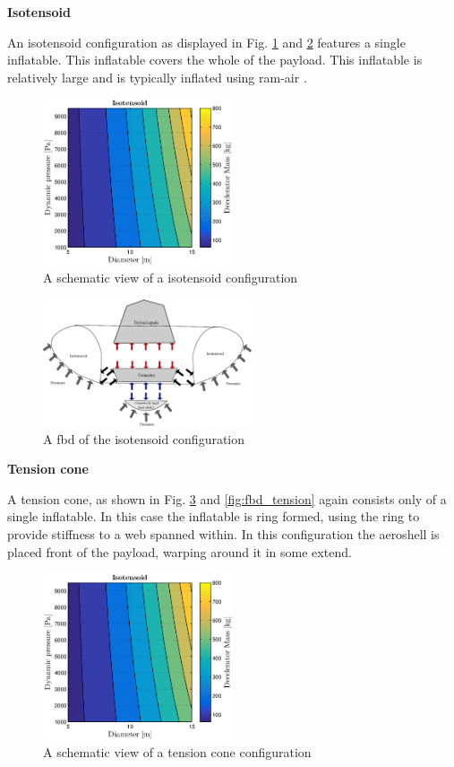 \textbf{Isotensoid}

An isotensoid configuration as displayed in Fig. \ref{fig:conc_iso} and \ref{fig:fbd_iso} features a single inflatable. This inflatable covers the whole of the payload. This inflatable is relatively large and is typically inflated using ram-air \cite{Smith2011}. 

\begin{figure}[H]
\centering
\includegraphics[width = 0.5\textwidth]{Figure/ISO_comp.eps}
\caption{A schematic view of a isotensoid configuration}
\label{fig:conc_iso}
\end{figure}

\begin{figure}[H]
\centering
\includegraphics[width = 0.55\textwidth]{Figure/FBD_isotensoid.eps}
\caption{A \gls{fbd} of the isotensoid configuration}
\label{fig:fbd_iso}
\end{figure}

\textbf{Tension cone}

A tension cone, as shown in Fig. \ref{fig:conc_tension} and \ref{fig:fbd_tension}  again consists only of a single inflatable. In this case the inflatable is ring formed, using the ring to provide stiffness to a web spanned within. In this configuration the aeroshell is placed front of the payload, warping around it in some extend.

\begin{figure}[H]
\centering
\includegraphics[width = 0.5\textwidth]{Figure/ISO_comp.eps}
\caption{A schematic view of a tension cone configuration}
\label{fig:conc_tension}
\end{figure}

